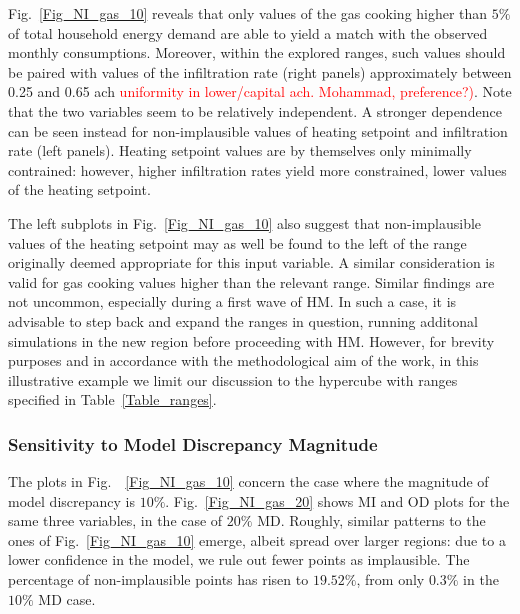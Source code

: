 \documentclass[preprint,12pt, sort&compress]{elsarticle}
\newcommand{\red}[1]{\textcolor{red}{#1}}
\begin{document}
Fig.~\ref{Fig_NI_gas_10} reveals that only values of the gas cooking higher than $5\%$ of total household energy demand are able to yield a match with the observed monthly consumptions. Moreover, within the explored ranges, such values should be paired with values of the infiltration rate (right panels) approximately between 0.25 and 0.65 ach \red{uniformity in lower/capital ach. Mohammad, preference?)}. Note that the two variables seem to be relatively independent. A stronger dependence can be seen instead for non-implausible values of heating setpoint and infiltration rate (left panels). Heating setpoint values are by themselves only minimally contrained: however, higher infiltration rates yield more constrained, lower values of the heating setpoint. 

The left subplots in Fig.~\ref{Fig_NI_gas_10} also suggest that non-implausible values of the heating setpoint may as well be found to the left of the range originally deemed appropriate for this input variable. A similar consideration is valid for gas cooking values higher than the relevant range. Similar findings are not uncommon, especially during a first wave of HM. In such a case, it is advisable to step back and expand the ranges in question, running additonal simulations in the new region before proceeding with HM. However, for brevity purposes and in accordance with the methodological aim of the work, in this illustrative example we limit our discussion to the hypercube with ranges specified in Table~\ref{Table_ranges}.


\subsubsection{Sensitivity to Model Discrepancy Magnitude}

The plots in Fig.~~\ref{Fig_NI_gas_10} concern the case where the magnitude of model discrepancy is $10\%$. Fig.~\ref{Fig_NI_gas_20}  shows MI and OD plots for the same three variables, in the case of $20\%$ MD. Roughly, similar patterns to the ones of Fig.~\ref{Fig_NI_gas_10} emerge, albeit spread over larger regions: due to a lower confidence in the model, we rule out fewer points as implausible. The percentage of non-implausible points has risen to $19.52\%$, from only $0.3\%$ in the $10\%$ MD case. 
\end{document}
